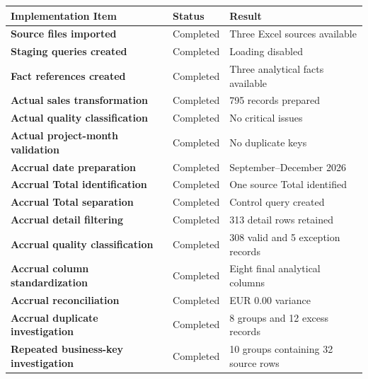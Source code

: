 \documentclass[11pt,a4paper]{article}
\begin{document}
\begin{tabularx}{\textwidth}{
    >{\bfseries}p{5.8cm}
    p{2.8cm}
    X
}

\toprule

Implementation Item
&
Status
&
Result
\\

\midrule

Source files imported
&
Completed
&
Three Excel sources available
\\

Staging queries created
&
Completed
&
Loading disabled
\\

Fact references created
&
Completed
&
Three analytical facts available
\\

Actual sales transformation
&
Completed
&
795 records prepared
\\

Actual quality classification
&
Completed
&
No critical issues
\\

Actual project-month validation
&
Completed
&
No duplicate keys
\\

Accrual date preparation
&
Completed
&
September--December 2026
\\

Accrual Total identification
&
Completed
&
One source Total identified
\\

Accrual Total separation
&
Completed
&
Control query created
\\

Accrual detail filtering
&
Completed
&
313 detail rows retained
\\

Accrual quality classification
&
Completed
&
308 valid and 5 exception records
\\

Accrual column standardization
&
Completed
&
Eight final analytical columns
\\

Accrual reconciliation
&
Completed
&
EUR 0.00 variance
\\

Accrual duplicate investigation
&
Completed
&
8 groups and 12 excess records
\\

Repeated business-key investigation
&
Completed
&
10 groups containing 32 source rows
\\


\end{tabularx}
\end{document}

